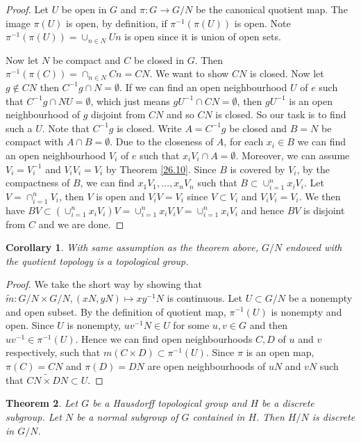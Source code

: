 \documentclass[12pt]{report}
\newtheorem{theorem}{Theorem}[section]
\newtheorem{corollary}[theorem]{Corollary}
\theoremstyle{definition}
\begin{document}
\begin{proof}
	Let $U$ be open in $G$ and $\pi: G\to G/N$ be the canonical quotient map. The image $\pi(U)$ is open, by definition, if $\pi^{-1}(\pi(U))$ is open. Note $\pi^{-1}(\pi(U))=\cup_{n\in N}Un$ is open since it is union of open sets.

	Now let $N$ be compact and $C$ be closed in $G$. Then $\pi^{-1}(\pi(C))=\cap_{n\in N}Cn=CN$. We want to show $CN$ is closed. Now let $g\notin CN$ then $C^{-1}g\cap N=\emptyset$. If we can find an open neighbourhood $U$ of $e$ such that $C^{-1}g \cap NU=\emptyset$, which just means $gU^{-1}\cap CN=\emptyset$, then $gU^{-1}$ is an open neighbourhood of $g$ disjoint from $CN$ and so $CN$ is closed. So our task is to find such a $U$. Note that $C^{-1}g$ is closed. Write $A=C^{-1}g$ be closed and $B=N$ be compact with $A\cap B=\emptyset$. Due to the closeness of $A$, for each $x_i\in B$ we can find an open neighbourhood $V_i$ of $e$ such that $x_iV_i\cap A=\emptyset$. Moreover, we can assume $V_i=V_i^{-1}$ and $V_iV_i= V_i$ by Theorem \ref{26.10}. Since $B$ is covered by $V_i$, by the compactness of $B$, we can find $x_1V_1,\dots,x_nV_n$ such that $B\subset \cup_{i=1}^n x_iV_i$. Let $V=\cap_{i=1}^n V_i$, then $V$ is open and $V_iV=V_i$ since $V\subset V_i$ and $V_iV_i=V_i$. We then have $BV \subset (\cup_{i=1}^n x_iV_i)V= \cup_{i=1}^n x_iV_iV = \cup_{i=1}^n x_iV_i$ and hence $BV$ is disjoint from $C$ and we are done.
\end{proof}

\begin{corollary}
	With same assumption as the theorem above, $G/N$ endowed with the quotient topology is a topological group.
\end{corollary}
\begin{proof}
	We take the short way by showing that $\tilde{m}: G/N \times G/N, (xN,yN)\mapsto xy^{-1}N$ is continuous. Let $U\subset G/N$ be a nonempty and open subset. By the definition of quotient map, $\pi^{-1}(U)$ is nonempty and open. Since $U$ is nonempty, $uv^{-1}N\in U$ for some $u,v\in G$ and then $uv^{-1}\in\pi^{-1}(U)$. Hence we can find open neighbourhoods $C,D$ of $u$ and $v$ respectively, such that $m(C\times D)\subset \pi^{-1}(U)$. Since $\pi$ is an open map, $\pi(C)=CN$ and $\pi(D)=DN$ are open neighbourhoods of $uN$ and $vN$ such that $\tilde{CN\times DN}\subset U$.
\end{proof}

\begin{theorem}
	Let $G$ be a Hausdorff topological group and $H$ be a discrete subgroup. Let $N$ be a normal subgroup of $G$ contained in $H$. Then $H/N$ is discrete in $G/N$.
\end{theorem}
\end{document}
